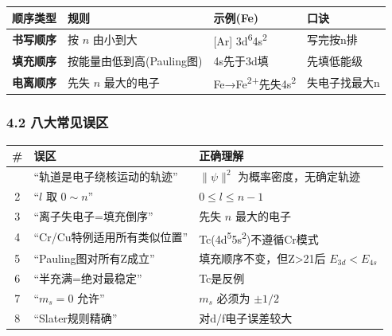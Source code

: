 {\def\LTcaptype{none} %
\begin{longtable}[]{@{}
  >{\raggedright\arraybackslash}p{}
  >{\raggedright\arraybackslash}p{}
  >{\raggedright\arraybackslash}p{}
  >{\raggedleft\arraybackslash}p{}@{}}
\toprule\noalign{}
\begin{minipage}[b]{\linewidth}\raggedright
顺序类型
\end{minipage} & \begin{minipage}[b]{\linewidth}\raggedright
规则
\end{minipage} & \begin{minipage}[b]{\linewidth}\raggedright
示例(Fe)
\end{minipage} & \begin{minipage}[b]{\linewidth}\raggedleft
口诀
\end{minipage} \\
\midrule\noalign{}
\endhead
\bottomrule\noalign{}
\endlastfoot
\textbf{书写顺序} & 按 \(n\) 由小到大 & {[}Ar{]} 3d\textsuperscript{6}4s\textsuperscript{2} & 写完按n排 \\
\textbf{填充顺序} & 按能量由低到高(Pauling图) & 4s先于3d填 & 先填低能级 \\
\textbf{电离顺序} & 先失 \(n\) 最大的电子 & Fe→Fe\textsuperscript{2+}先失4s\textsuperscript{2} & 失电子找最大n \\
\end{longtable}
}

\subsubsection{4.2 八大常见误区}\label{ux516bux5927ux5e38ux89c1ux8befux533a}

{\def\LTcaptype{none} %
\begin{longtable}[]{@{}cll@{}}
\toprule\noalign{}
\# & 误区 & 正确理解 \\
\midrule\noalign{}
\endhead
\bottomrule\noalign{}
\endlastfoot
1 & ``轨道是电子绕核运动的轨迹'' & \(\|\psi\|^2\) 为概率密度，无确定轨迹 \\
2 & ``\(l\) 取 \(0 \sim n\)'' & \(0 \leq l \leq n-1\) \\
3 & ``离子失电子=填充倒序'' & 先失 \(n\) 最大的电子 \\
4 & ``Cr/Cu特例适用所有类似位置'' & Tc(4d\textsuperscript{5}5s\textsuperscript{2})不遵循Cr模式 \\
5 & ``Pauling图对所有Z成立'' & 填充顺序不变，但Z\textgreater21后 \(E_{3d}<E_{4s}\) \\
6 & ``半充满=绝对最稳定'' & Tc是反例 \\
7 & ``\(m_s=0\) 允许'' & \(m_s\) 必须为 \(\pm1/2\) \\
8 & ``Slater规则精确'' & 对d/f电子误差较大 \\
\end{longtable}
}

